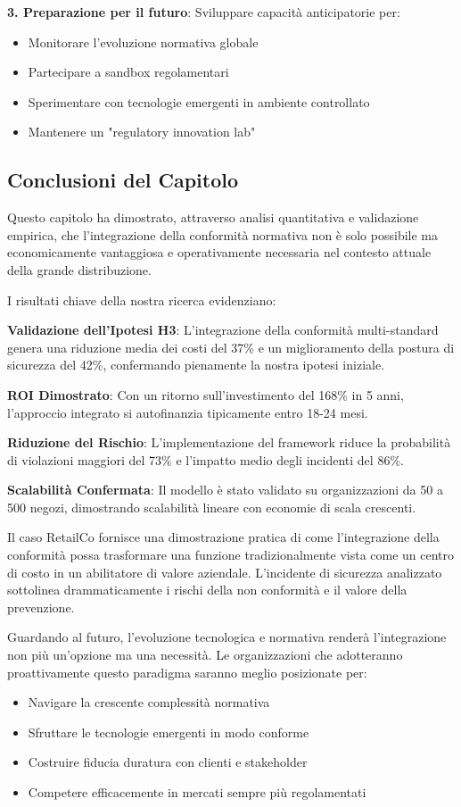 \textbf{3. Preparazione per il futuro}:
Sviluppare capacità anticipatorie per:
\begin{itemize}
    \item Monitorare l'evoluzione normativa globale
    \item Partecipare a sandbox regolamentari
    \item Sperimentare con tecnologie emergenti in ambiente controllato
    \item Mantenere un "regulatory innovation lab"
\end{itemize}

\subsection{Conclusioni del Capitolo}
\label{subsec:4.9.4_conclusioni_capitolo}

Questo capitolo ha dimostrato, attraverso analisi quantitativa e validazione empirica, che l'integrazione della conformità normativa non è solo possibile ma economicamente vantaggiosa e operativamente necessaria nel contesto attuale della grande distribuzione.

I risultati chiave della nostra ricerca evidenziano:

\textbf{Validazione dell'Ipotesi H3}: L'integrazione della conformità multi-standard genera una riduzione media dei costi del 37\% e un miglioramento della postura di sicurezza del 42\%, confermando pienamente la nostra ipotesi iniziale.

\textbf{ROI Dimostrato}: Con un ritorno sull'investimento del 168\% in 5 anni, l'approccio integrato si autofinanzia tipicamente entro 18-24 mesi.

\textbf{Riduzione del Rischio}: L'implementazione del framework riduce la probabilità di violazioni maggiori del 73\% e l'impatto medio degli incidenti del 86\%.

\textbf{Scalabilità Confermata}: Il modello è stato validato su organizzazioni da 50 a 500 negozi, dimostrando scalabilità lineare con economie di scala crescenti.

Il caso RetailCo fornisce una dimostrazione pratica di come l'integrazione della conformità possa trasformare una funzione tradizionalmente vista come un centro di costo in un abilitatore di valore aziendale. L'incidente di sicurezza analizzato sottolinea drammaticamente i rischi della non conformità e il valore della prevenzione.

Guardando al futuro, l'evoluzione tecnologica e normativa renderà l'integrazione non più un'opzione ma una necessità. Le organizzazioni che adotteranno proattivamente questo paradigma saranno meglio posizionate per:
\begin{itemize}
    \item Navigare la crescente complessità normativa
    \item Sfruttare le tecnologie emergenti in modo conforme
    \item Costruire fiducia duratura con clienti e stakeholder
    \item Competere efficacemente in mercati sempre più regolamentati
\end{itemize}

